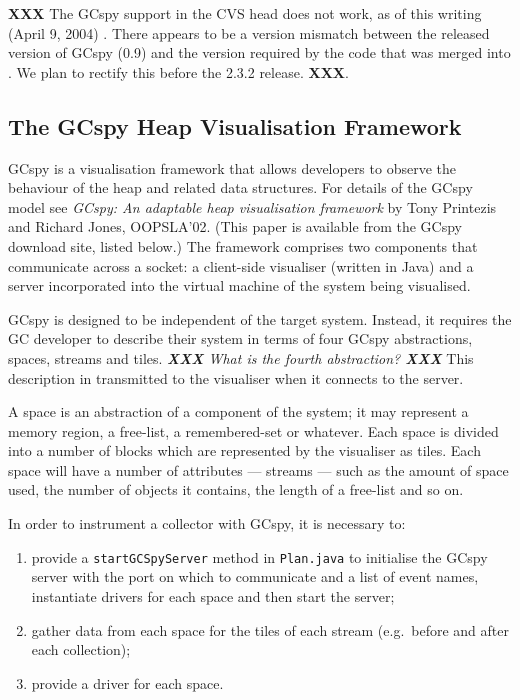 \newcommand{\rvmRoot} {\texttt{\$RVM\_ROOT}}

{\bf XXX} The GCspy support in the \jrvm{} CVS head does not work, as
of this writing (April 9, 2004) .  There appears to be a version
mismatch between the released version of GCspy (0.9) and the version
required by the code that was merged into \jrvm{}.  We plan to
rectify this before the 2.3.2 release.  \textbf{XXX}.

\subsection{The GCspy Heap Visualisation Framework}

GCspy is a visualisation framework that allows developers to observe
the behaviour of the heap and related data structures.  For details of
the GCspy model see \textit{GCspy: An adaptable heap visualisation framework}
by Tony Printezis and Richard Jones, OOPSLA'02.  (This paper is
available from the GCspy download site, listed below.)  The framework
comprises two components that communicate across a socket: a
client-side visualiser (written in Java) and a server incorporated
into the virtual machine of the system being visualised.

GCspy is designed to be independent of the target system.  Instead, it
requires the GC developer to describe their system in terms of four
GCspy abstractions, spaces, streams and tiles.   \textit{\textbf{XXX} What is
the fourth abstraction? \textbf{XXX}} This description in
transmitted to the visualiser when it connects to the server. 

A space is an abstraction of a component of the system; it may
represent a memory region, a free-list, a remembered-set or whatever.
Each space is divided into a number of blocks which are represented by
the visualiser as tiles.  Each space will have a number of attributes
--- streams --- such as the amount of space used, the number of
objects it contains, the length of a free-list and so on. 

In order to instrument a \jrvm{} collector with GCspy, it is necessary to:
\begin{enumerate}
   \item provide a \texttt{startGCSpyServer} method in \texttt{Plan.java} to initialise the GCspy server with the port on which to communicate and a list of event names, instantiate drivers for each space and then start the server;
   \item gather data from each space for the tiles of each stream (e.g.\ before and after each collection);
   \item  provide a driver for each space. 
\end{enumerate} 

